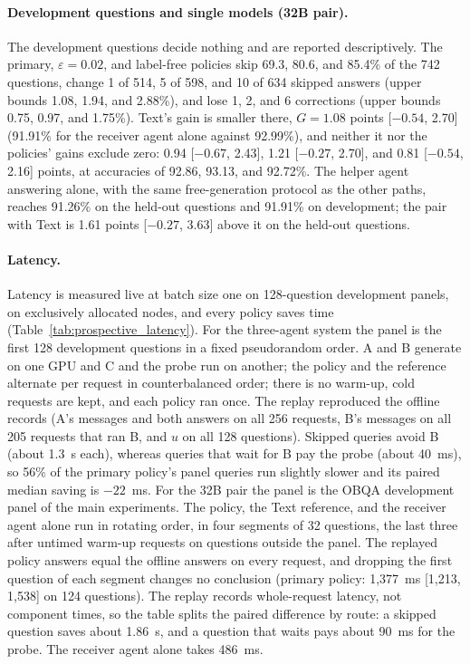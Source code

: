 \paragraph{Development questions and single models (32B pair).} The development questions decide nothing and are reported descriptively. The primary, $\varepsilon=0.02$, and label-free policies skip 69.3, 80.6, and 85.4\% of the 742 questions, change 1 of 514, 5 of 598, and 10 of 634 skipped answers (upper bounds 1.08, 1.94, and 2.88\%), and lose 1, 2, and 6 corrections (upper bounds 0.75, 0.97, and 1.75\%). Text's gain is smaller there, $G=1.08$ points [$-0.54$, 2.70] (91.91\% for the receiver agent alone against 92.99\%), and neither it nor the policies' gains exclude zero: 0.94 [$-0.67$, 2.43], 1.21 [$-0.27$, 2.70], and 0.81 [$-0.54$, 2.16] points, at accuracies of 92.86, 93.13, and 92.72\%. The helper agent answering alone, with the same free-generation protocol as the other paths, reaches 91.26\% on the held-out questions and 91.91\% on development; the pair with Text is 1.61 points [$-0.27$, 3.63] above it on the held-out questions.

\paragraph{Latency.} Latency is measured live at batch size one on 128-question development panels, on exclusively allocated nodes, and every policy saves time (Table~\ref{tab:prospective_latency}). For the three-agent system the panel is the first 128 development questions in a fixed pseudorandom order. A and B generate on one GPU and C and the probe run on another; the policy and the reference alternate per request in counterbalanced order; there is no warm-up, cold requests are kept, and each policy ran once. The replay reproduced the offline records (A's messages and both answers on all 256 requests, B's messages on all 205 requests that ran B, and $u$ on all 128 questions). Skipped queries avoid B (about 1.3~s each), whereas queries that wait for B pay the probe (about 40~ms), so 56\% of the primary policy's panel queries run slightly slower and its paired median saving is $-22$~ms. For the 32B pair the panel is the OBQA development panel of the main experiments. The policy, the Text reference, and the receiver agent alone run in rotating order, in four segments of 32 questions, the last three after untimed warm-up requests on questions outside the panel. The replayed policy answers equal the offline answers on every request, and dropping the first question of each segment changes no conclusion (primary policy: 1,377~ms [1,213, 1,538] on 124 questions). The replay records whole-request latency, not component times, so the table splits the paired difference by route: a skipped question saves about 1.86~s, and a question that waits pays about 90~ms for the probe. The receiver agent alone takes 486~ms.

